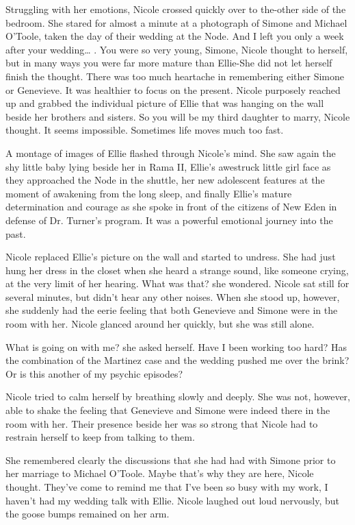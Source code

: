 \documentclass[]{article}
\begin{document}
{Struggling with her emotions, Nicole crossed quickly over to the-other side of the bedroom. She stared for almost a minute at a photograph of Simone and Michael O’Toole, taken the day of their wedding at the Node. And I left you only a week after your wedding… . You were so very young, Simone, Nicole thought to herself, but in many ways you were far more mature than Ellie-She did not let herself finish the thought. There was too much heartache in remembering either Simone or Genevieve. It was healthier to focus on the present. Nicole purposely reached up and grabbed the individual picture of Ellie that was hanging on the wall beside her brothers and sisters. So you will be my third daughter to marry, Nicole thought. It seems impossible. Sometimes life moves much too fast.

A montage of images of Ellie flashed through Nicole’s mind. She saw again the shy little baby lying beside her in Rama II, Ellie’s awestruck little girl face as they approached the Node in the shuttle, her new adolescent features at the moment of awakening from the long sleep, and finally Ellie’s mature determination and courage as she spoke in front of the citizens of New Eden in defense of Dr. Turner’s program. It was a powerful emotional journey into the past.

Nicole replaced Ellie’s picture on the wall and started to undress. She had just hung her dress in the closet when she heard a strange sound, like someone crying, at the very limit of her hearing. What was that? she wondered. Nicole sat still for several minutes, but didn’t hear any other noises. When she stood up, however, she suddenly had the eerie feeling that both Genevieve and Simone were in the room with her. Nicole glanced around her quickly, but she was still alone.

What is going on with me? she asked herself. Have I been working too hard? Has the combination of the Martinez case and the wedding pushed me over the brink? Or is this another of my psychic episodes?

Nicole tried to calm herself by breathing slowly and deeply. She was not, however, able to shake the feeling that Genevieve and Simone were indeed there in the room with her. Their presence beside her was so strong that Nicole had to restrain herself to keep from talking to them.

She remembered clearly the discussions that she had had with Simone prior to her marriage to Michael O’Toole. Maybe that’s why they are here, Nicole thought. They’ve come to remind me that I’ve been so busy with my work, I haven’t had my wedding talk with Ellie. Nicole laughed out loud nervously, but the goose bumps remained on her arm.

}
\end{document}
